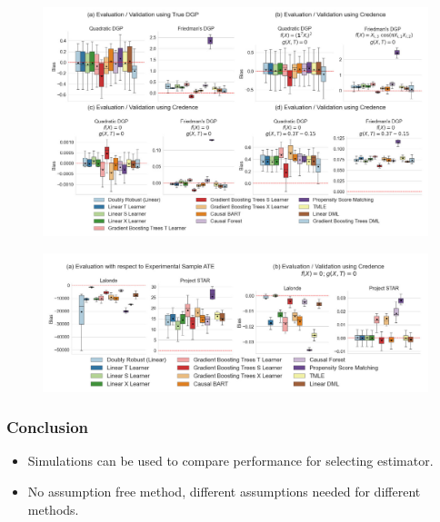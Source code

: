 \documentclass{beamer}
\begin{document}
\begin{frame}
	\begin{figure}
		\includegraphics[width=\textwidth]{fig_3.jpg}
	\end{figure}
\end{frame}
\begin{frame}
	\begin{figure}
		\includegraphics[width=\textwidth]{fig_4.jpg}
	\end{figure}
\end{frame}

\begin{frame}
	\frametitle{Conclusion}
	\begin{itemize}
		\item Simulations can be used to compare performance for selecting estimator.
		\item No assumption free method, different assumptions needed for different methods.
	\end{itemize}
\end{frame}
\end{document}
